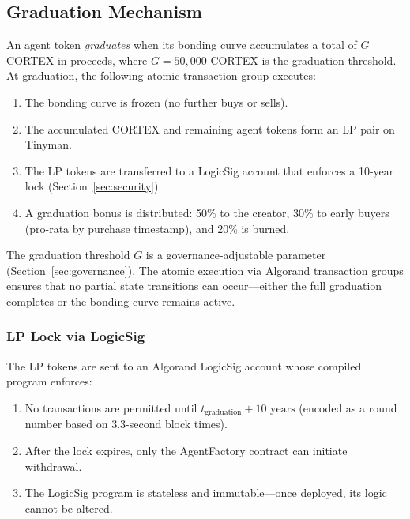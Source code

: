 \subsection{Graduation Mechanism}
\label{subsec:graduation}

\begin{definition}[Graduation]
\label{def:graduation}
An agent token \emph{graduates} when its bonding curve accumulates a total of
$G$ CORTEX in proceeds, where $G = 50{,}000$ CORTEX is the graduation
threshold. At graduation, the following atomic transaction group executes:
\begin{enumerate}
  \item The bonding curve is frozen (no further buys or sells).
  \item The accumulated CORTEX and remaining agent tokens form an LP pair on
    Tinyman.
  \item The LP tokens are transferred to a LogicSig account that enforces a
    10-year lock (Section~\ref{sec:security}).
  \item A graduation bonus is distributed: 50\% to the creator, 30\% to
    early buyers (pro-rata by purchase timestamp), and 20\% is burned.
\end{enumerate}
\end{definition}

The graduation threshold $G$ is a governance-adjustable parameter
(Section~\ref{sec:governance}). The atomic execution via Algorand transaction
groups ensures that no partial state transitions can occur---either the full
graduation completes or the bonding curve remains active.

\subsubsection{LP Lock via LogicSig}

The LP tokens are sent to an Algorand LogicSig account whose compiled program
enforces:

\begin{enumerate}
  \item No transactions are permitted until $t_{\text{graduation}} + 10
    \text{ years}$ (encoded as a round number based on 3.3-second block
    times).
  \item After the lock expires, only the AgentFactory contract can initiate
    withdrawal.
  \item The LogicSig program is stateless and immutable---once deployed, its
    logic cannot be altered.
\end{enumerate}

